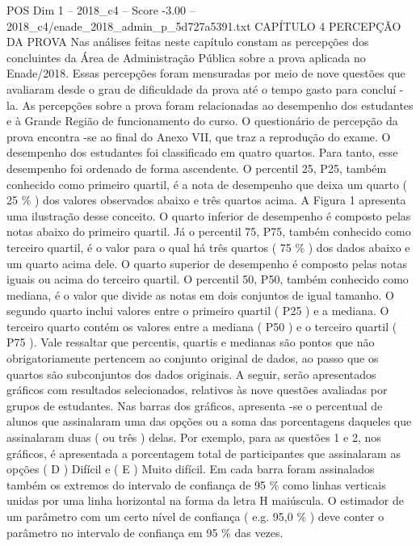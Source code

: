 \begin{textsample}{POS Dim 1 – 2018\_c4 – Score -3.00 – 2018\_c4/enade\_2018\_admin\_p\_5d727a5391.txt}  \label{ex:f1_pos_303}
CAPÍTULO 4 PERCEPÇÃO DA PROVA Nas análises feitas neste capítulo constam as percepções dos concluintes da Área de Administração Pública sobre a prova aplicada no Enade/2018.
Essas percepções foram mensuradas por meio de nove questões que avaliaram desde o grau de dificuldade da prova até o tempo gasto para concluí -la.
As percepções sobre a prova foram relacionadas ao desempenho dos estudantes e à Grande Região de funcionamento do curso.
O questionário de percepção da prova encontra -se ao final do Anexo VII, que traz a reprodução do exame.
O desempenho dos estudantes foi classificado em quatro quartos.
Para tanto, esse desempenho foi ordenado de forma ascendente.
O percentil 25, P25, também conhecido como primeiro quartil, é a nota de desempenho que deixa um quarto ( 25 \% ) dos valores observados abaixo e três quartos acima.
A Figura 1 apresenta uma ilustração desse conceito.
O quarto inferior de desempenho é composto pelas notas abaixo do primeiro quartil.
Já o percentil 75, P75, também conhecido como terceiro quartil, é o valor para o qual há três quartos ( 75 \% ) dos dados abaixo e um quarto acima dele.
O quarto superior de desempenho é composto pelas notas iguais ou acima do terceiro quartil.
O percentil 50, P50, também conhecido como mediana, é o valor que divide as notas em dois conjuntos de igual tamanho.
O segundo quarto inclui valores entre o primeiro quartil ( P25 ) e a mediana.
O terceiro quarto contém os valores entre a mediana ( P50 ) e o terceiro quartil ( P75 ).
Vale ressaltar que percentis, quartis e medianas são pontos que não obrigatoriamente pertencem ao conjunto original de dados, ao passo que os quartos são subconjuntos dos dados originais.
A seguir, serão apresentados gráficos com resultados selecionados, relativos às nove questões avaliadas por grupos de estudantes.
Nas barras dos gráficos, apresenta -se o percentual de alunos que assinalaram uma das opções ou a soma das porcentagens daqueles que assinalaram duas ( ou três ) delas.
Por exemplo, para as questões 1 e 2, nos gráficos, é apresentada a porcentagem total de participantes que assinalaram as opções ( D ) Difícil e ( E ) Muito difícil.
Em cada barra foram assinalados também os extremos do intervalo de confiança de 95 \% como linhas verticais unidas por uma linha horizontal na forma da letra H maiúscula.
O estimador de um parâmetro com um certo nível de confiança ( e.g. 95,0 \% ) deve conter o parâmetro no intervalo de confiança em 95 \% das vezes.

\end{textsample}
